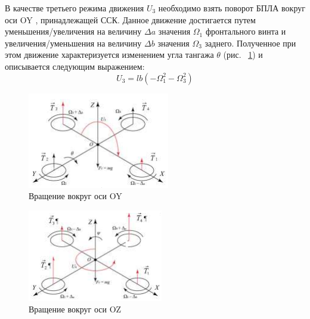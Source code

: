 В качестве третьего режима движения \(U_{3}\) необходимо взять поворот БПЛА вокруг оси OY , принадлежащей ССК. Данное движение достигается путем уменьшения/увеличения на величину \(\Delta a\) значения \(\Omega_{1}\) фронтального винта и увеличения/уменьшения на величину \(\Delta b\) значения \(\Omega_{3}\) заднего. Полученное при этом движение характеризуется изменением угла тангажа \(\theta\) (рис. ~\ref{fig:ris3}) и описывается следующим выражением:
\begin{equation}
U_{3}=lb(-\Omega_{1}^2-\Omega_{3}^2)
\end{equation}
\begin{figure}[H]
	\centering
	\includegraphics[width=0.5\linewidth]{pics/ris3}
	\caption{Вращение вокруг оси OY
	}
	\label{fig:ris3} %
\end{figure}
\begin{figure}[H]
	\centering
	\includegraphics[width=0.5\linewidth]{pics/ris4}
	\caption{Вращение вокруг оси OZ
	}
	\label{fig:ris4} %
\end{figure}

